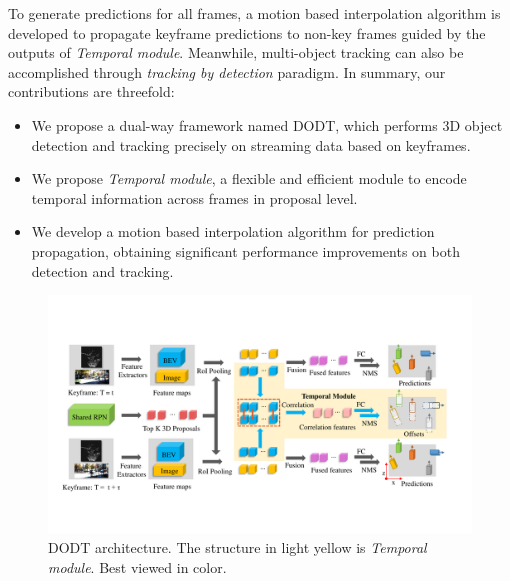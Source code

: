 \documentclass[letterpaper, 10pt, conference]{ieeeconf}  %
\begin{document}
To generate predictions for all frames, a motion based interpolation algorithm is developed to propagate keyframe predictions to non-key frames guided by the outputs of \textit{Temporal module}. Meanwhile, multi-object tracking can also be accomplished through \textit{tracking by detection} \cite{lenz2015followme} paradigm. In summary, our contributions are threefold:
\begin{itemize}
	\item We propose a dual-way framework named DODT,  which performs 3D object detection and tracking precisely on streaming data based on keyframes.
	\item We propose \textit{Temporal module}, a flexible and efficient module to encode temporal information across frames in proposal level.
	\item We develop a motion based interpolation algorithm for prediction propagation, obtaining significant performance improvements on both detection and tracking.  
\end{itemize}

\begin{figure}
	\rule{0pt}{1ex}
	\begin{center}
		\includegraphics[trim={1.1cm, 3.3cm, 1.5cm, 3.5cm}, clip, width=\textwidth]{images/structure_final.pdf}
	\end{center}
	\setlength{\abovecaptionskip}{-1pt}
	\caption{DODT architecture. The structure in light yellow is \textit{Temporal module}. Best viewed in color.}
	\label{fig:dodt}
	\vspace{-0.5cm}
\end{figure}
\end{document}
